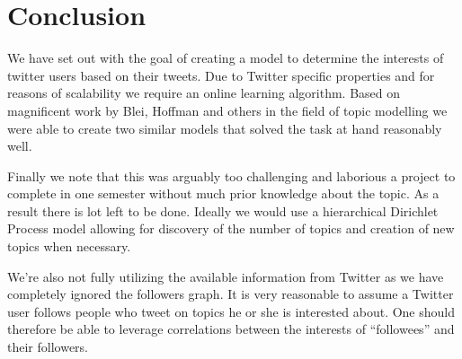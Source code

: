\section{Conclusion}
We have set out with the goal of creating a model to determine the interests of twitter users based on their tweets. Due to Twitter specific properties and for reasons of scalability we require an online learning algorithm. Based on magnificent work by Blei, Hoffman and others in the field of topic modelling we were able to create two similar models that solved the task at hand reasonably well.

Finally we note that this was arguably too challenging and laborious a project to complete in one semester without much prior knowledge about the topic. As a result there is lot left to be done. Ideally we would use a hierarchical Dirichlet Process model allowing for discovery of the number of topics and creation of new topics when necessary.

We're also not fully utilizing the available information from Twitter as we have completely ignored the followers graph. It is very reasonable to assume a Twitter user follows people who tweet on topics he or she is interested about. One should therefore be able to leverage correlations between the interests of ``followees'' and their followers.
